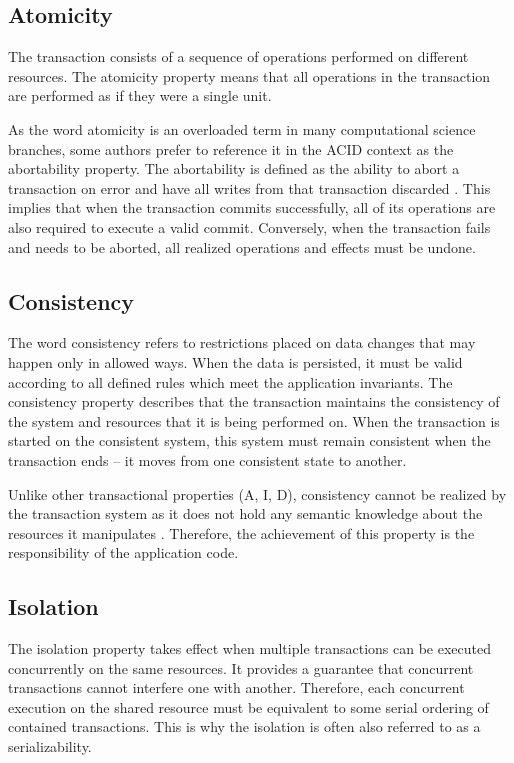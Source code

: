 \documentclass[oneside,
  digital, %
  table,   %
  lof,     %
  lot,     %
]{fithesis3}
\begin{document}
\subsection{Atomicity}

The transaction consists of a sequence of operations performed on different resources. The atomicity property means that all operations in the transaction are performed as if they were a single unit. 

As the word atomicity is an overloaded term in many computational science branches, some authors prefer to reference it in the ACID context as the abortability property. The abortability is defined as  the ability to abort a transaction on error and have all writes from that transaction discarded \cite{design_data_intens_apps}. This implies that when the transaction commits successfully, all of its operations are also required to execute a valid commit. Conversely, when the transaction fails and needs to be aborted, all realized operations and effects must be undone.

\subsection{Consistency}

The word consistency refers to restrictions placed on data changes that may happen only in allowed ways. When the data is persisted, it must be valid according to all defined rules which meet the application invariants. The consistency property describes that the transaction maintains the consistency of the system and resources that it is being performed on. When the transaction is started on the consistent system, this system must remain consistent when the transaction ends -- it moves from one consistent state to another.

Unlike other transactional properties (A, I, D), consistency cannot be realized by the transaction system as it does not hold any semantic knowledge about the resources it manipulates \cite{java_tran_processing}. Therefore, the achievement of this property is the responsibility of the application code.

\subsection{Isolation}

The isolation property takes effect when multiple transactions can be executed concurrently on the same resources. It provides a guarantee that concurrent transactions cannot interfere one with another. Therefore, each concurrent execution on the shared resource must be equivalent to some serial ordering of contained transactions. This is why the isolation is often also referred to as a serializability.
\end{document}
